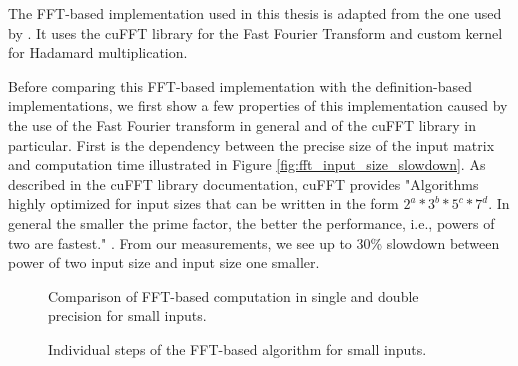The FFT-based implementation used in this thesis is adapted from the one used by \citet{misko}. It uses the cuFFT library for the Fast Fourier Transform and custom kernel for Hadamard multiplication. 

Before comparing this FFT-based implementation with the definition-based implementations, we first show a few properties of this implementation caused by the use of the Fast Fourier transform in general and of the cuFFT library in particular. First is the dependency between the precise size of the input matrix and computation time illustrated in Figure \ref{fig:fft_input_size_slowdown}. As described in the cuFFT library documentation, cuFFT provides "Algorithms highly optimized for input sizes that can be written in the form $2^{a}*3^{b}*5^{c}*7^{d}$. In general the smaller the prime factor, the better the performance, i.e., powers of two are fastest." \citep{site:cufft}. From our measurements, we see up to 30\% %
slowdown between power of two input size and input size one smaller. 


\begin{figure}[ht]
	\centering
	\def\svgwidth{0.5\textwidth}
	
	\caption{Comparison of FFT-based computation in single and double precision for small inputs.}
	\label{fig:fft_double_faster_compute_time}
\end{figure}

\begin{figure}[ht]
	\centering
	\def\svgwidth{\textwidth}
	
	\caption{Individual steps of the FFT-based algorithm for small inputs.}
	\label{fig:fft_double_faster_steps}
\end{figure}


